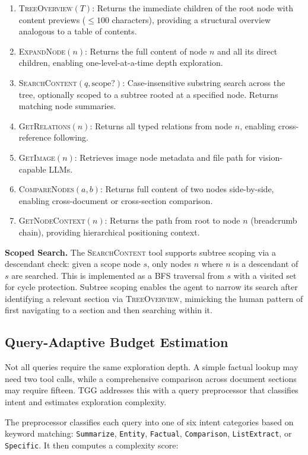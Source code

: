 \documentclass[conference]{IEEEtran}
\begin{document}
\begin{enumerate}
    \item \textsc{TreeOverview}$(T)$: Returns the immediate children of the root node with content previews ($\leq 100$ characters), providing a structural overview analogous to a table of contents.
    \item \textsc{ExpandNode}$(n)$: Returns the full content of node $n$ and all its direct children, enabling one-level-at-a-time depth exploration.
    \item \textsc{SearchContent}$(q, \text{scope}?)$: Case-insensitive substring search across the tree, optionally scoped to a subtree rooted at a specified node. Returns matching node summaries.
    \item \textsc{GetRelations}$(n)$: Returns all typed relations from node $n$, enabling cross-reference following.
    \item \textsc{GetImage}$(n)$: Retrieves image node metadata and file path for vision-capable LLMs.
    \item \textsc{CompareNodes}$(a, b)$: Returns full content of two nodes side-by-side, enabling cross-document or cross-section comparison.
    \item \textsc{GetNodeContext}$(n)$: Returns the path from root to node $n$ (breadcrumb chain), providing hierarchical positioning context.
\end{enumerate}

\textbf{Scoped Search.} The \textsc{SearchContent} tool supports subtree scoping via a descendant check: given a scope node $s$, only nodes $n$ where $n$ is a descendant of $s$ are searched. This is implemented as a BFS traversal from $s$ with a visited set for cycle protection. Subtree scoping enables the agent to narrow its search after identifying a relevant section via \textsc{TreeOverview}, mimicking the human pattern of first navigating to a section and then searching within it.

\subsection{Query-Adaptive Budget Estimation}

Not all queries require the same exploration depth. A simple factual lookup may need two tool calls, while a comprehensive comparison across document sections may require fifteen. TGG addresses this with a query preprocessor that classifies intent and estimates exploration complexity.

The preprocessor classifies each query into one of six intent categories based on keyword matching: \texttt{Summarize}, \texttt{Entity}, \texttt{Factual}, \texttt{Comparison}, \texttt{ListExtract}, or \texttt{Specific}. It then computes a complexity score:
\end{document}
